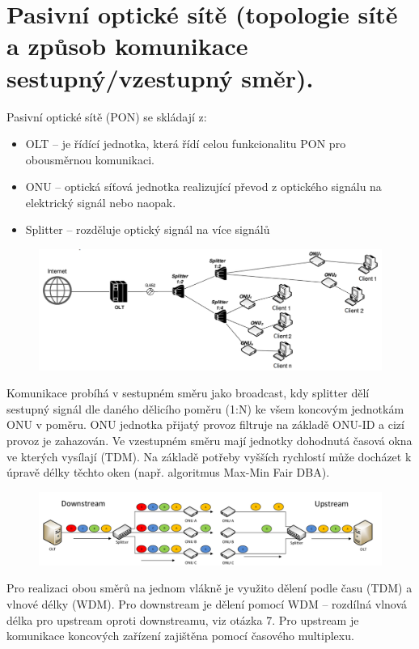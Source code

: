 \clearpage
\section{Pasivní optické sítě (topologie sítě a způsob komunikace sestupný/vzestupný směr).}
Pasivní optické sítě (PON) se skládají z:
\begin{itemize}
    \item OLT -- je řídící jednotka, která řídí celou funkcionalitu PON pro obousměrnou komunikaci.
    \item ONU -- optická síťová jednotka realizující převod z optického signálu na elektrický signál nebo naopak.
    \item Splitter -- rozděluje optický signál na více signálů
\end{itemize}
\begin{figure} [h]
    \centering
    \includegraphics[width=\textwidth]{snimky/PONTopologie.png}
    \label{fig:pon}
\end{figure}

Komunikace probíhá v sestupném směru jako broadcast, kdy splitter dělí sestupný signál dle daného dělicího poměru (1:N) ke všem koncovým jednotkám ONU v poměru. ONU jednotka přijatý provoz filtruje na základě ONU-ID a cizí provoz je zahazován. Ve vzestupném směru mají jednotky dohodnutá časová okna ve kterých vysílají (TDM). Na základě potřeby vyšších rychlostí může docházet k úpravě délky těchto oken (např. algoritmus Max-Min Fair DBA).

\begin{figure} [h]
    \centering
    \includegraphics[width=\textwidth]{snimky/upDownPON.png}
\end{figure}

Pro realizaci obou směrů na jednom vlákně je využito dělení podle času (TDM) a vlnové délky (WDM). Pro downstream je dělení pomocí WDM -- rozdílná vlnová délka pro upstream oproti downstreamu, viz otázka 7. Pro upstream je komunikace koncových zařízení zajištěna pomocí časového multiplexu.

